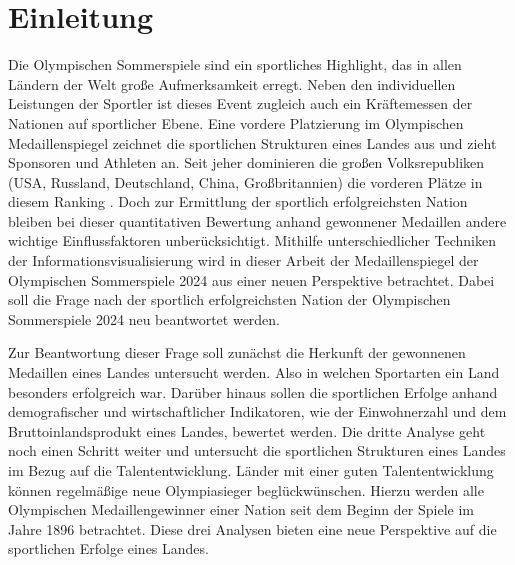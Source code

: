 \section{Einleitung}


Die Olympischen Sommerspiele sind ein sportliches Highlight, das in allen Ländern der Welt große Aufmerksamkeit erregt. Neben den individuellen Leistungen der Sportler ist dieses Event zugleich auch ein Kräftemessen der Nationen auf sportlicher Ebene. Eine vordere Platzierung im Olympischen Medaillenspiegel zeichnet die sportlichen Strukturen eines Landes aus und zieht Sponsoren und Athleten an. Seit jeher dominieren die großen Volksrepubliken (USA, Russland, Deutschland, China, Großbritannien) die vorderen Plätze in diesem Ranking \cite{olyAllTime}. Doch zur Ermittlung der sportlich erfolgreichsten Nation bleiben bei dieser quantitativen Bewertung anhand gewonnener Medaillen andere wichtige Einflussfaktoren unberücksichtigt. Mithilfe unterschiedlicher Techniken der Informationsvisualisierung wird in dieser Arbeit der Medaillenspiegel der Olympischen Sommerspiele 2024 aus einer neuen Perspektive betrachtet. Dabei soll die Frage nach der sportlich erfolgreichsten Nation der Olympischen Sommerspiele 2024 neu beantwortet werden.

Zur Beantwortung dieser Frage soll zunächst die Herkunft der gewonnenen Medaillen eines Landes untersucht werden. Also in welchen Sportarten ein Land besonders erfolgreich war. Darüber hinaus sollen die sportlichen Erfolge anhand demografischer und wirtschaftlicher Indikatoren, wie der Einwohnerzahl und dem Bruttoinlandsprodukt eines Landes, bewertet werden.  Die dritte Analyse geht noch einen Schritt weiter und untersucht die sportlichen Strukturen eines Landes im Bezug auf die Talententwicklung. Länder mit einer guten Talententwicklung können regelmäßige neue Olympiasieger beglückwünschen. Hierzu werden alle Olympischen Medaillengewinner einer Nation seit dem Beginn der Spiele im Jahre 1896 betrachtet. Diese drei Analysen bieten eine neue Perspektive auf die sportlichen Erfolge eines Landes.

